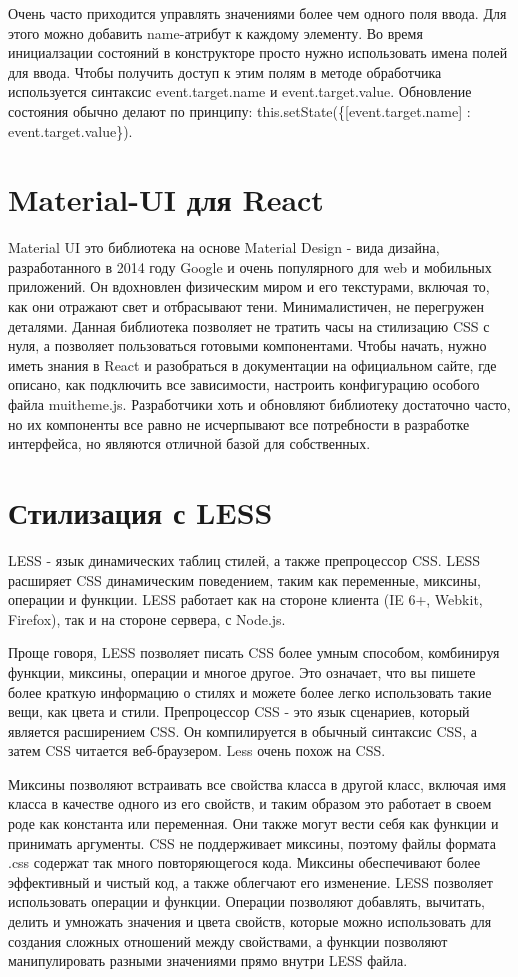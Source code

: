 \documentclass[a4paper,12pt]{diplom}
\begin{document}
Очень часто приходится управлять значениями более чем одного поля ввода. Для этого можно добавить name-атрибут к каждому элементу.
Во время инициалзации состояний в конструкторе просто нужно использовать имена полей для ввода.
Чтобы получить доступ к этим полям в методе обработчика используется синтаксис event.target.name и event.target.value.
Обновление состояния обычно делают по принципу: this.setState(\{[event.target.name] : event.target.value\}).

\section{Material-UI для React}

Material UI это библиотека на основе Material Design - вида дизайна, разработанного в 2014 году Google и очень популярного для web и мобильных приложений.
Он вдохновлен физическим миром и его текстурами, включая то, как они отражают свет и отбрасывают тени. Минималистичен, не перегружен деталями.
Данная библиотека позволяет не тратить часы на стилизацию CSS с нуля, а позволяет пользоваться готовыми компонентами. Чтобы начать, нужно иметь знания в React и разобраться в документации на официальном сайте,
где описано, как подключить все зависимости, настроить конфигурацию особого файла muitheme.js. Разработчики хоть и обновляют библиотеку достаточно часто, но их компоненты все равно не исчерпывают все потребности в разработке интерфейса,
но являются отличной базой для собственных.

\section{Стилизация с LESS}

LESS - язык динамических таблиц стилей, а также препроцессор CSS.
LESS расширяет CSS динамическим поведением, таким как переменные, миксины, операции и функции. LESS работает как на стороне клиента (IE 6+, Webkit, Firefox), так и на стороне сервера, с Node.js.

Проще говоря, LESS позволяет писать CSS более умным способом, комбинируя функции, миксины, операции и многое другое. Это означает, что вы пишете более краткую информацию о стилях и можете более легко использовать такие вещи, как цвета и стили.
Препроцессор CSS - это язык сценариев, который является расширением CSS. Он компилируется в обычный синтаксис CSS, а затем CSS читается веб-браузером. Less очень похож на CSS.

Миксины позволяют встраивать все свойства класса в другой класс, включая имя класса в качестве одного из его свойств, и таким образом это работает в своем роде как константа или переменная. Они также могут вести себя как функции и принимать аргументы. CSS не поддерживает миксины, поэтому файлы формата .css содержат так много повторяющегося кода. Миксины обеспечивают более эффективный и чистый код, а также облегчают его изменение.
LESS позволяет использовать операции и функции. Операции позволяют добавлять, вычитать, делить и умножать значения и цвета свойств, которые можно использовать для создания сложных отношений между свойствами, а функции позволяют манипулировать разными значениями прямо внутри LESS файла.
\end{document}
